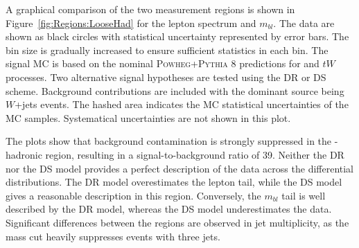 A graphical comparison of the two measurement regions is shown in Figure~\ref{fig:Regions:LooseHad} for the lepton \pt spectrum and $m_{bl}$.
The data are shown as black circles with statistical uncertainty represented by error bars. The bin size is gradually increased to ensure sufficient statistics in each bin. The signal MC is based on the nominal \textsc{Powheg+Pythia} 8 predictions for \ttbar and $tW$ processes.
Two alternative \tW signal hypotheses are tested using the DR or DS scheme. Background contributions are included 
with the dominant source being $W$+jets events.
The hashed area indicates the MC statistical uncertainties of the MC samples.
Systematical uncertainties are not shown in this plot.

The plots show that background contamination is strongly suppressed in the \Wboson-hadronic region, resulting in a signal-to-background ratio of 39. Neither the DR nor the DS model provides a perfect description of the data across the differential distributions. The DR model overestimates the lepton
\pt tail, while the DS model gives a reasonable description in this region. Conversely, the $m_{bl}$ tail is well described by the DR model, whereas the DS model underestimates the data.
Significant differences between the regions are observed in jet multiplicity,
as the \Wboson mass cut heavily suppresses events with three jets.

